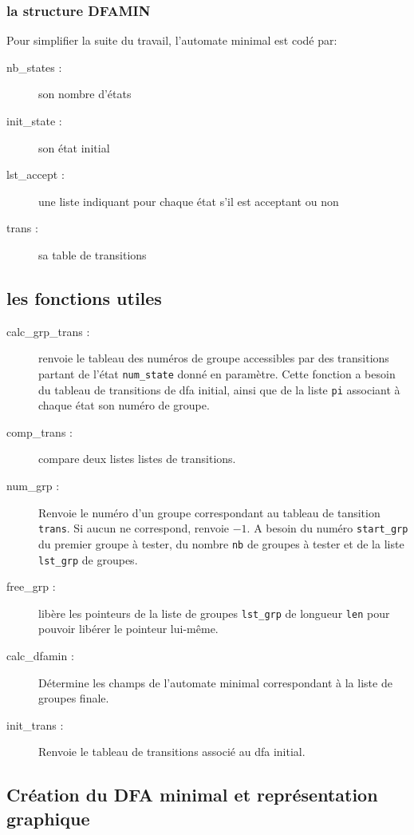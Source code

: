 \documentclass[12pt, a4paper]{article}
\begin{document}
\subsubsection{la structure DFAMIN}

Pour simplifier la suite du travail, l'automate minimal est codé par:
\begin{description}
\item[nb\_states :] son nombre d'états
\item[init\_state :] son état initial 
\item[lst\_accept :] une liste indiquant pour chaque état s'il est acceptant ou non
\item[trans :] sa table de transitions

\end{description}

\subsection{les fonctions utiles}

\begin{description}
\item[calc\_grp\_trans :] renvoie le tableau des numéros de groupe accessibles par des transitions partant de l'état \texttt{num\_state} donné en paramètre. Cette fonction a besoin du tableau de transitions de dfa initial, ainsi que de la liste \texttt{pi} associant à chaque état son numéro de groupe.
\item[comp\_trans :] compare deux listes listes de transitions.
\item[num\_grp :] Renvoie le numéro d'un groupe correspondant au tableau de tansition \texttt{trans}. Si aucun ne correspond, renvoie $-1$. A besoin du numéro \texttt{start\_grp} du premier groupe à tester, du nombre \texttt{nb} de groupes à tester et de la liste \texttt{lst\_grp} de groupes.
\item[free\_grp :] libère les pointeurs de la liste de groupes \texttt{lst\_grp} de longueur \texttt{len} pour pouvoir libérer le pointeur lui-même.
\item[calc\_dfamin :] Détermine les champs de l'automate minimal correspondant à la liste de groupes finale.
\item[init\_trans :] Renvoie le tableau de transitions associé au dfa initial.
\end{description}

\subsection{Création du DFA minimal et représentation graphique}
\end{document}
